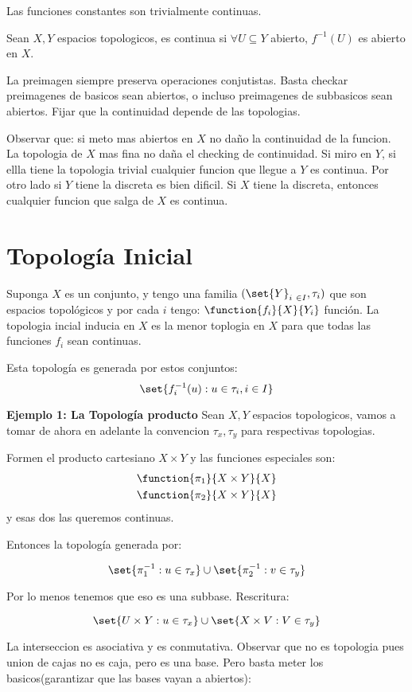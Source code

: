 Las funciones constantes son trivialmente continuas.

\begin{define}
	Sean $X,Y$ espacios topologicos, es continua si $\forall U \subseteq Y $ abierto, $ f^{-1}(U)$ es abierto en $X$. 
\end{define}
La preimagen siempre preserva operaciones conjutistas. Basta checkar preimagenes de basicos sean abiertos, o incluso preimagenes de subbasicos sean abiertos. Fijar que la continuidad depende de las topologias.

Observar que: si meto mas abiertos en $X$ no daño la continuidad de la funcion. La topologia de $X$ mas fina no daña el checking de continuidad. Si miro en $Y$, si ellla tiene la topologia trivial cualquier funcion que llegue a $Y$ es continua. Por otro lado si $Y$ tiene la discreta es bien dificil. Si $X$ tiene la discreta, entonces cualquier funcion que salga de $X$ es continua.
\section{Topología Inicial}
Suponga $X$ es un conjunto, y tengo una familia $ (\set{Y}_{i\ \in I}, \tau_i) $ que son espacios topológicos y por cada $i$ tengo: $\function{f_i}{X}{Y_i}$  función. La topologia incial inducia en $X$ es la menor toplogia en $X$ para que todas las funciones $f_i$ sean continuas.

Esta topología es generada por estos conjuntos:
\[ \set{f_i^{-1} (u): u \in \tau_i, i \in I} \]

\textbf{Ejemplo 1: La Topología producto}
Sean $X,Y$ espacios topologicos, vamos a tomar de ahora en adelante la convencion $\tau_x, \tau_y$ para respectivas topologias.

Formen el producto cartesiano $ X \times Y$ y las funciones especiales son:
\begin{align*}
\function{\pi_1}{X \times Y}{X} \\
\function{\pi_2}{X \times Y}{X}
\end{align*}
 y esas dos las queremos continuas.
 
Entonces la topología generada por:

\[ \set{\pi_1^{-1} : u \in \tau_x} \cup \set{\pi_2^{-1} : v \in \tau_y} \]

Por lo menos tenemos que eso es una subbase. Rescritura:

\[ \set{U \times Y: u \in \tau_x} \cup \set{ X \times V : V \in \tau_y} \]

La interseccion es asociativa y es conmutativa. Observar que no es topologia pues union de cajas no es caja, pero es una base.
Pero basta meter los basicos(garantizar que las bases vayan a abiertos):

